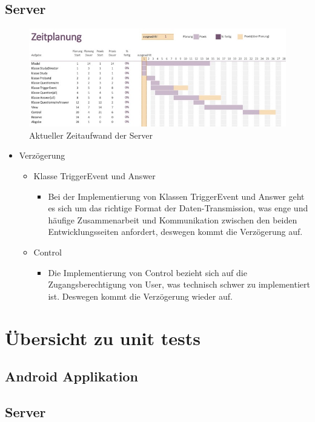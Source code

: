\documentclass[a4paper]{scrreprt}
\begin{document}
\begin{itemize}
        \end{itemize}


        \section{Server}
        \begin{figure}[H]
        	\centering
        	\includegraphics[scale = 0.65]{ServerZeitPlanung.jpg}
        	\caption{Aktueller Zeitaufwand der Server }
        \end{figure}
        \begin{itemize}   
        	\item Verzögerung
        	\begin{itemize}
        		\item Klasse TriggerEvent und Answer
        		\begin{itemize}
        			\item Bei der Implementierung von Klassen TriggerEvent und Answer geht es sich um das richtige Format der Daten-Transmission, was enge und häufige Zusammenarbeit und Kommunikation zwischen den beiden Entwicklungsseiten anfordert, deswegen kommt die Verzögerung auf. 
        		\end{itemize}
        	\end{itemize}  
        	\begin{itemize}
        		\item Control
        		\begin{itemize}
        			\item Die Implementierung von Control bezieht sich auf die Zugangsberechtigung von User, was technisch schwer zu implementiert ist. Deswegen kommt die Verzögerung wieder auf.
        		\end{itemize}
        	\end{itemize}                                             
        	
        \end{itemize}

       \newpage

    \chapter{Übersicht zu unit tests}

        \section{Android Applikation}

        \section{Server}

    \newpage
\end{document}
